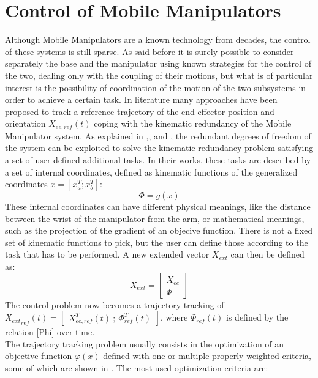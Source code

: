 \section{Control of Mobile Manipulators}
Although Mobile Manipulators are a known technology from decades, the control of these systems is still sparse. As said before it is surely possible to consider separately the base and the manipulator using known strategies for the control of the two, dealing only with the coupling of their motions, but what is of particular interest is the possibility of coordination of the motion of the two subsystems in order to achieve a certain task. In literature many approaches have been proposed to track a reference trajectory of the end effector position and orientation $X_{ee,ref}(t)$ coping with the kinematic redundancy of the Mobile Manipulator system. As explained in \cite{bayle},\cite{seraji1998},\cite{seraji1993} and \cite{mikschschroeder}, the redundant degrees of freedom of the system can be exploited to solve the kinematic redundancy problem satisfying a set of user-defined additional tasks. In their works, these tasks are described by a set of internal coordinates, defined as kinematic functions of the generalized coordinates $x=\left[x_a^T ; x_b^T\right]$:
\begin{equation}\label{Phi}
	\Phi=g(x)
\end{equation}
These internal coordinates can have different physical meanings, like the distance between the wrist of the manipulator from the arm, or mathematical meanings, such as the projection of the gradient of an objecive function. There is not a fixed set of kinematic functions to pick, but the user can define those according to the task that has to be performed. A new extended vector $X_{ext}$ can then be defined as:
\begin{equation}
	X_{ext}=\left[\begin{matrix}
	X_{ee} \\ \Phi
	\end{matrix}\right]
\end{equation}
The control problem now becomes a trajectory tracking of ${X_{ext}}_{ref}(t) =\left[\begin{matrix} X_{ee,ref}^T(t) \ ;\ \Phi_{ref}^T(t) \end{matrix}\right]$, where $ \Phi_{ref}(t)$ is defined by the relation \ref{Phi} over time.\\
The trajectory tracking problem usually consists in the optimization of an objective function $\varphi(x)$ defined with one or multiple properly weighted criteria, some of which are shown in \cite{multicriteria}. The most used optimization criteria are: 
